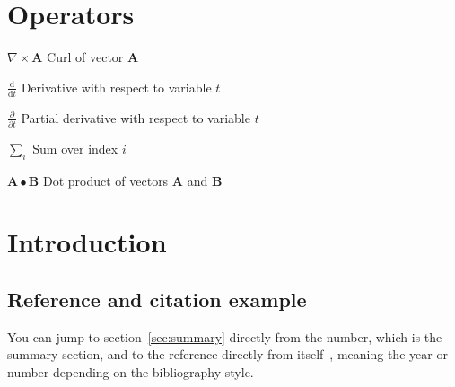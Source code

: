 \documentclass[12pt, a4paper, oneside]{article}
\begin{document}
\section*{Operators}

\begin{abbreviations}
    \item [$\nabla \times \mathbf{A}$]                    Curl of vector $\mathbf{A}$
    \item [$\displaystyle\frac{\mbox{d}}{\mbox{d} t}$]    Derivative with respect to variable $t$
    \item [$\displaystyle\frac{\partial}{\partial t}$]    Partial derivative with respect to variable $t$
    \item [$\sum_i $]                                     Sum over index $i$
    \item [$\mathbf{A} \bullet \mathbf{B}$]               Dot product of vectors $\mathbf{A}$ and $\mathbf{B}$
\end{abbreviations}

\cleardoublepage


\setcounter{page}{1}
\onehalfspacing

\section{Introduction} \label{sec:intro}


\blindtext
\blinditemize
\blindtext

\subsection{Reference and citation example} \label{subsec:reference-and-citation-example}

You can jump to section~\ref{sec:summary} directly from the number, which is the summary section,
and to the reference directly from itself~\citep{vet2007ophthal},
meaning the year or number depending on the bibliography style.

\end{document}
